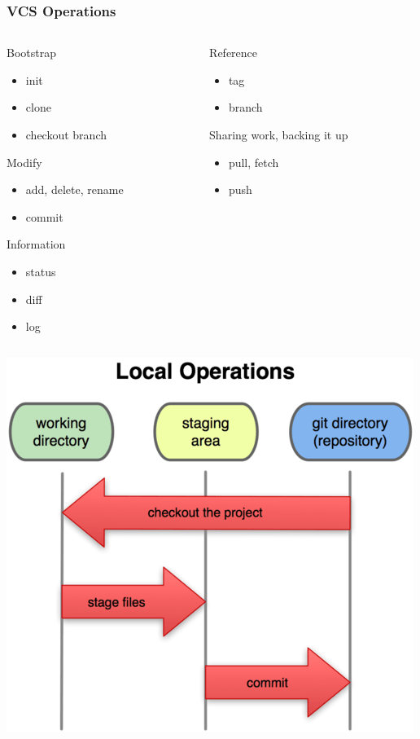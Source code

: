 \documentclass[english,compress]{beamer}
\begin{document}
\frame
{
    \frametitle{VCS Operations}
        \begin{columns}
            \begin{column}{.5\textwidth}
        Bootstrap
            \begin{itemize}
                \item init
                \item clone
                \item checkout branch
            \end{itemize}
        Modify
        \begin{itemize}
            \item add, delete, rename
            \item commit
        \end{itemize}
         Information
        \begin{itemize}
            \item status
            \item diff
            \item log
        \end{itemize}
   \end{column}
    \begin{column}{.5\textwidth}
        Reference
        \begin{itemize}
            \item tag
            \item branch
        \end{itemize}
        Sharing work, backing it up
\begin{itemize}
    \item pull, fetch
    \item push
\end{itemize}

    \end{column}
\end{columns}

}
\frame
{
    \begin{center}
        \includegraphics[width=.8\textwidth]{figs/sections.png}
    \end{center}
}
\end{document}
